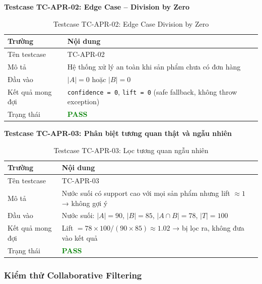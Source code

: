 \documentclass[12pt,a4paper]{report}
\begin{document}
\textbf{Testcase TC-APR-02: Edge Case -- Division by Zero}

\begin{table}[htbp]
\centering
\renewcommand{\arraystretch}{1.3}
\begin{tabular}{|l|p{8cm}|}
\hline
\rowcolor[HTML]{EFEFEF}
\textbf{Trường} & \textbf{Nội dung} \\ \hline
Tên testcase & TC-APR-02 \\ \hline
Mô tả & Hệ thống xử lý an toàn khi sản phẩm chưa có đơn hàng \\ \hline
Đầu vào & $|A| = 0$ hoặc $|B| = 0$ \\ \hline
Kết quả mong đợi & \texttt{confidence = 0}, \texttt{lift = 0} (safe fallback, không throw exception) \\ \hline
Trạng thái & \textcolor{green}{\textbf{PASS}} \\ \hline
\end{tabular}
\caption{Testcase TC-APR-02: Edge Case Division by Zero}
\end{table}

\textbf{Testcase TC-APR-03: Phân biệt tương quan thật và ngẫu nhiên}

\begin{table}[htbp]
\centering
\renewcommand{\arraystretch}{1.3}
\begin{tabular}{|l|p{8cm}|}
\hline
\rowcolor[HTML]{EFEFEF}
\textbf{Trường} & \textbf{Nội dung} \\ \hline
Tên testcase & TC-APR-03 \\ \hline
Mô tả & Nước suối có support cao với mọi sản phẩm nhưng lift $\approx 1$ → không gợi ý \\ \hline
Đầu vào & Nước suối: $|A| = 90$, $|B| = 85$, $|A \cap B| = 78$, $|T| = 100$ \\ \hline
Kết quả mong đợi & Lift $= 78 \times 100 / (90 \times 85) \approx 1.02$ → bị lọc ra, không đưa vào kết quả \\ \hline
Trạng thái & \textcolor{green}{\textbf{PASS}} \\ \hline
\end{tabular}
\caption{Testcase TC-APR-03: Lọc tương quan ngẫu nhiên}
\end{table}

\subsubsection{Kiểm thử Collaborative Filtering}
\end{document}
